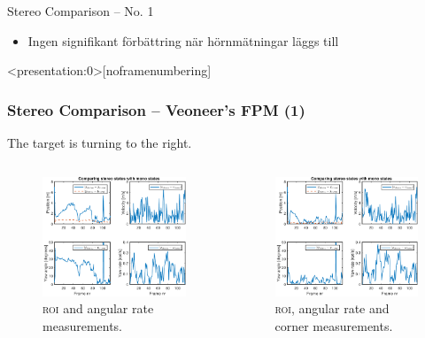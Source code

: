 \documentclass{beamer}
\newcommand{\roi}{\textsc{roi}\xspace}
\renewcommand{\aa}{\"a\xspace}
\renewcommand{\o}{\"o\xspace}
\begin{document}
\begin{frame}{Stereo Comparison -- No. 1}
	\note
	{
		\begin{itemize}
			\item Ingen signifikant f\o{}rb\aa{}ttring när h\o{}rnm\aa{}tningar l\aa{}ggs till
		\end{itemize}
	}
\end{frame}

\begin{frame}<presentation:0>[noframenumbering]
	\frametitle{Stereo Comparison -- Veoneer's FPM (1)}
	The target is turning to the right.
	\begin{columns}
	\begin{figure}
		\centering
		\includegraphics[width=\textwidth]{Veoneer/155532_RoiAngVel_gate}
		\caption{\roi and angular rate measurements.}
	\end{figure}
	\begin{figure}
		\centering
		\includegraphics[width=\textwidth]{Veoneer/155532_AllMeasurements_gate}
		\caption{\roi, angular rate and corner measurements.}
	\end{figure}
	\end{columns}


\end{frame}
\end{document}
